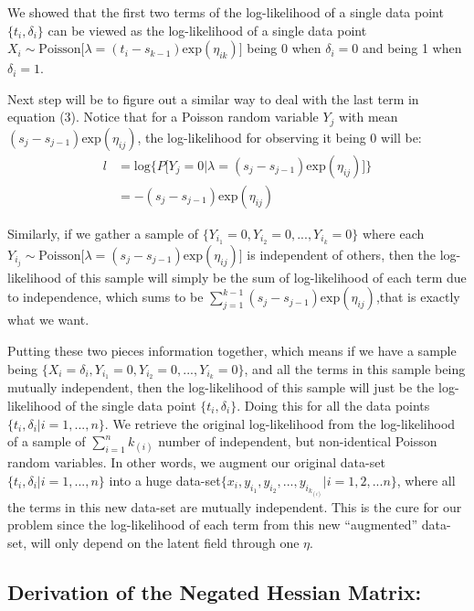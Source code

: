 \documentclass[]{article}
\begin{document}
We showed that the first two terms of the log-likelihood of a single
data point \(\{t_i,\delta_i\}\) can be viewed as the log-likelihood of a
single data point
\(X_i\sim \text{Poisson}\big[\lambda =(t_i-s_{k-1})\text{exp}(\eta_{ik})\big]\)
being \(0\) when \(\delta_i = 0\) and being 1 when \(\delta_i = 1\).

Next step will be to figure out a similar way to deal with the last term
in equation (3). Notice that for a Poisson random variable \(Y_j\) with
mean \((s_{j}-s_{j-1})\text{exp}(\eta_{ij})\), the log-likelihood for
observing it being \(0\) will be:
\begin{equation}\begin{aligned}\label{eqn:loglike3}
l &= \text{log}\bigg \{P\big [Y_j =0|\lambda = (s_{j}-s_{j-1})\text{exp}(\eta_{ij})\big ]\bigg \}\\
  &= -(s_{j}-s_{j-1})\text{exp}(\eta_{ij})
\end{aligned}\end{equation}

Similarly, if we gather a sample of
\(\{Y_{i_{1}}=0,Y_{i_{2}} =0, ..., Y_{i_{k}}=0 \}\) where each
\(Y_{i_j} \sim \text{Poisson}\big[\lambda = (s_{j}-s_{j-1})\text{exp}(\eta_{ij})\big]\)
is independent of others, then the log-likelihood of this sample will
simply be the sum of log-likelihood of each term due to independence,
which sums to be
\(\sum_{j=1}^{k-1} (s_{j}-s_{j-1})\text{exp}(\eta_{ij})\),that is
exactly what we want.

Putting these two pieces information together, which means if we have a
sample being
\(\{X_i =\delta_i,Y_{i_{1}}=0,Y_{i_{2}} =0, ..., Y_{i_{k}}=0 \}\), and
all the terms in this sample being mutually independent, then the
log-likelihood of this sample will just be the log-likelihood of the
single data point \(\{t_i,\delta_i\}\). Doing this for all the data
points \(\{t_i,\delta_i|i=1,...,n\}\). We retrieve the original
log-likelihood from the log-likelihood of a sample of
\(\sum_{i=1}^{n}{k_{(i)}}\) number of independent, but non-identical
Poisson random variables. In other words, we augment our original
data-set \(\{t_i,\delta_i|i=1,...,n\}\) into a huge
data-set\(\{x_i ,y_{i_{1}},y_{i_{2}}, ..., y_{i_{k_{(i)}}}|i=1,2,...n\}\),
where all the terms in this new data-set are mutually independent. This
is the cure for our problem since the log-likelihood of each term from
this new ``augmented'' data-set, will only depend on the latent field
through one \(\eta\).

\hypertarget{derivation-of-the-negated-hessian-matrix}{%
\subsection{Derivation of the Negated Hessian
Matrix:}\label{derivation-of-the-negated-hessian-matrix}}
\end{document}
